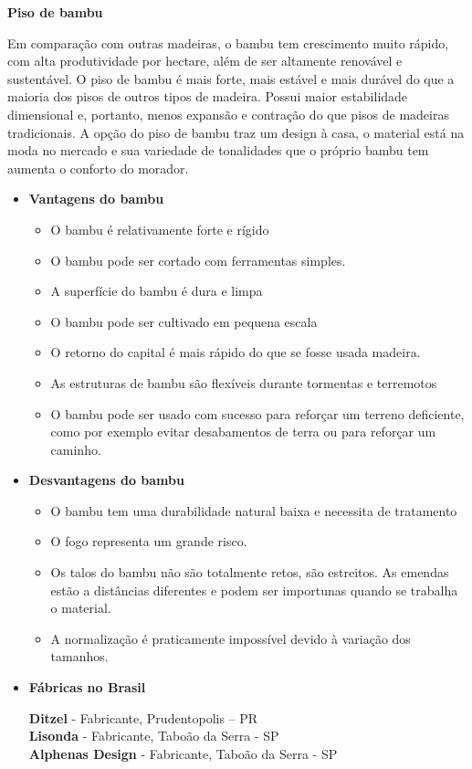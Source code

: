 \textbf{Piso de bambu}

	Em comparação com outras madeiras, o bambu tem crescimento muito rápido, com alta produtividade por hectare, além de ser altamente renovável e sustentável. O piso de bambu é mais forte, mais estável e mais durável do que a maioria dos pisos de outros tipos de madeira. Possui maior estabilidade dimensional e, portanto, menos expansão e contração do que pisos de madeiras tradicionais. A opção do piso de bambu traz um design à casa, o material está na moda no mercado e sua variedade de tonalidades que o próprio bambu tem aumenta o conforto do morador.

\begin{itemize}
\item \textbf{Vantagens do bambu}
\begin{itemize}
	\item O bambu é relativamente forte e rígido
	\item O bambu pode ser cortado com ferramentas simples.
	\item A superfície do bambu é dura e limpa
	\item O bambu pode ser cultivado em pequena escala
	\item O retorno do capital é mais rápido do que se fosse usada madeira.
	\item As estruturas de bambu são flexíveis durante tormentas e terremotos
	\item O bambu pode ser usado com sucesso para reforçar um terreno deficiente, como por exemplo evitar desabamentos de terra ou para reforçar um caminho.
\end{itemize}

\item \textbf{Desvantagens do bambu}
\begin{itemize}
	\item O bambu tem uma durabilidade natural baixa e necessita de tratamento
	\item O fogo representa um grande risco.
	\item Os talos do bambu não são totalmente retos, são estreitos. As emendas estão a distâncias diferentes e podem ser importunas quando se trabalha o material.
	\item A normalização é praticamente impossível devido à variação dos tamanhos.
\end{itemize}

\item \textbf{Fábricas no Brasil}

\textbf{Ditzel} - Fabricante, Prudentopolis – PR\\
\textbf{Lisonda} - Fabricante, Taboão da Serra - SP\\
\textbf{Alphenas Design} - Fabricante, Taboão da Serra - SP
\end{itemize}

